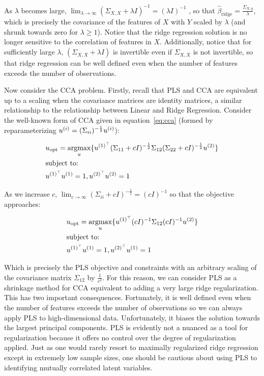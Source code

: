 As $\lambda$ becomes large, $\lim_{\lambda \to \infty} (\Sigma_{X,X} + \lambda I)^{-1} = (\lambda I)^{-1}$
, so that $\hat{\beta}_{\text{ridge}}=\frac{\Sigma_{X,y}}{\lambda}$, which is precisely the covariance of the features of $X$ with $Y$ scaled by $\lambda$ (and shrunk towards zero for $\lambda \geq 1$).
Notice that the ridge regression solution is no longer sensitive to the correlation of features in $X$.
Additionally, notice that for sufficiently large $\lambda$, $(\Sigma_{X,X} + \lambda I)$ is invertible even if $\Sigma_{X,X}$ is not invertible, so that ridge regression can be well defined even when the number of features exceeds the number of observations.

Now consider the CCA problem.
Firstly, recall that PLS and CCA are equivalent up to a scaling when the covariance matrices are identity matrices, a similar relationship to the relationship between Linear and Ridge Regression.
Consider the well-known form of CCA given in equation~\ref{eq:cca}\citep{mihalik2022canonical} (formed by reparameterizing \(u^{(i)}=(\Sigma_{ii})^{-\frac{1}{2}}u^{(i)}\)):

\begin{align}\label{eq:cca}
     & u_{\text{opt}}=\underset{u}{\mathrm{argmax}}\{ u^{(1)^{\top}}(\Sigma_{11}+ c I)^{-\frac{1}{2}}\Sigma_{12}(\Sigma_{22}+c I)^{-\frac{1}{2}}u^{(2)} \} \\
     & \text{subject to:} \notag \\
     & u^{(1)^{\top}}u^{(1)}=1, u^{(2)^{\top}}u^{(2)}=1 \notag
\end{align}

As we increase $c$, $\lim_{c \to \infty} (\Sigma_{ii}+ c I)^{-\frac{1}{2}}= (c I)^{-1}$ so that the objective approaches:

\begin{align}
     & u_{\text{opt}}=\underset{u}{\mathrm{argmax}}\{ u^{(1)^{\top}}(c I)^{-1}\Sigma_{12}(c I)^{-1}u^{(2)} \} \\
        & \text{subject to:} \notag \\
        & u^{(1)^{\top}}u^{(1)}=1, u^{(2)^{\top}}u^{(1)}=1 \notag
\end{align}

Which is precisely the PLS objective and constraints with an arbitrary scaling of the covariance matrix $\Sigma_{12}$ by $\frac{1}{c^2}$.
For this reason, we can consider PLS as a shrinkage method for CCA equivalent to adding a very large ridge regularization.
This has two important consequences.
Fortunately, it is well defined even when the number of features exceeds the number of observations so we can always apply PLS to high-dimensional data.
Unfortunately, it biases the solution towards the largest principal components.
PLS is evidently not a nuanced as a tool for regularization because it offers no control over the degree of regularization applied.
Just as one would rarely resort to maximally regularized ridge regression except in extremely low sample sizes, one should be cautious about using PLS to identifying mutually correlated latent variables.

